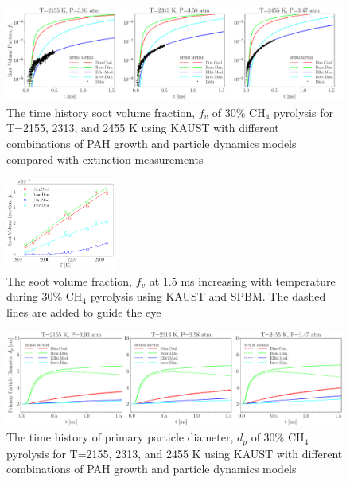\begin{figure}[H]
	\centering
	\includegraphics[width=1\textwidth]{Figures/Results/Shocktube/Stanford/june/30CH4_sootvf_kaust_subset.pdf}
	\caption{The time history soot volume fraction, $f_v$ of 30\% $\mathrm{CH_4}$ pyrolysis for T=2155, 2313, and 2455 K using KAUST with different combinations of PAH growth and particle dynamics models compared with extinction measurements}
	\label{fig:shocktubest_30ch4_fv_kaust_subset} 
\end{figure}


\begin{figure}[H]
	\centering
	\includegraphics[width=0.32\textwidth]{Figures/Results/Shocktube/Stanford/june/30CH4_sootvf_kaust_1.5ms.pdf}
	\caption{The soot volume fraction, $f_v$ at 1.5 ms increasing with temperature during 30\% $\mathrm{CH_4}$ pyrolysis using KAUST and SPBM. The dashed lines are added to guide the eye}
	\label{fig:shocktubest_30ch4_fv_kaust_last} 
\end{figure}

\begin{figure}[H]
	\centering
	\includegraphics[width=1\textwidth]{Figures/Results/Shocktube/Stanford/june/30CH4_sootdp_kaust_subset.pdf}
	\caption{The time history of primary particle diameter, $d_p$ of 30\% $\mathrm{CH_4}$ pyrolysis for T=2155, 2313, and 2455 K using KAUST with different combinations of PAH growth and particle dynamics models}
	\label{fig:shocktubest_30ch4_dp_kaust_subset} 
\end{figure}

